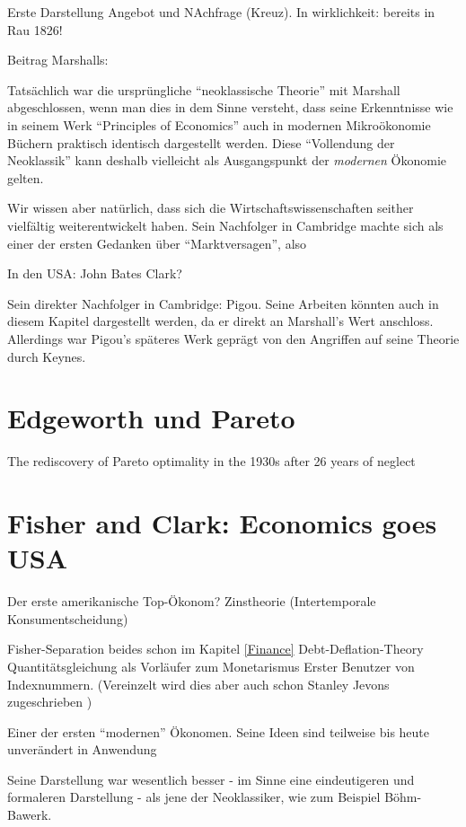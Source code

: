 Erste Darstellung Angebot und NAchfrage (Kreuz). In wirklichkeit: bereits in Rau 1826! \textcite[S. 159]{Blaug2001}


Beitrag Marshalls: \textcite{Ekelund2002}


Tatsächlich war die ursprüngliche "`neoklassische Theorie"' mit Marshall abgeschlossen, wenn man dies in dem Sinne versteht, dass seine Erkenntnisse wie in seinem Werk "`Principles of Economics"' auch in modernen Mikroökonomie Büchern praktisch identisch dargestellt werden. Diese "`Vollendung der Neoklassik"' kann deshalb vielleicht als Ausgangspunkt der \textit{modernen} Ökonomie gelten. 


Wir wissen aber natürlich, dass sich die Wirtschaftswissenschaften seither vielfältig weiterentwickelt haben.  Sein Nachfolger in Cambridge machte sich als einer der ersten Gedanken über "`Marktversagen"', also 



In den USA: John Bates Clark?


Sein direkter Nachfolger in Cambridge: Pigou. Seine Arbeiten könnten auch in diesem Kapitel dargestellt werden, da er direkt an Marshall's Wert anschloss. Allerdings war Pigou's späteres Werk geprägt von den Angriffen auf seine Theorie durch Keynes. 







\section{Edgeworth und Pareto}
The rediscovery of Pareto optimality in the 1930s after
26 years of neglect \textcite[S. 148]{Blaug2001}





\section{Fisher and Clark: Economics goes USA}
Der erste amerikanische Top-Ökonom?
Zinstheorie (Intertemporale Konsumentscheidung)

Fisher-Separation
beides schon im Kapitel \ref{Finance}
Debt-Deflation-Theory
Quantitätsgleichung als Vorläufer zum Monetarismus
Erster Benutzer von Indexnummern. (Vereinzelt wird dies aber auch schon Stanley Jevons zugeschrieben \parencite[S. 232]{Jevons1934})

Einer der ersten "`modernen"' Ökonomen. Seine Ideen sind teilweise bis heute unverändert in Anwendung

Seine Darstellung war wesentlich besser - im Sinne eine eindeutigeren und formaleren Darstellung - als jene der Neoklassiker, wie zum Beispiel Böhm-Bawerk.


\textcite{Tobin2005}